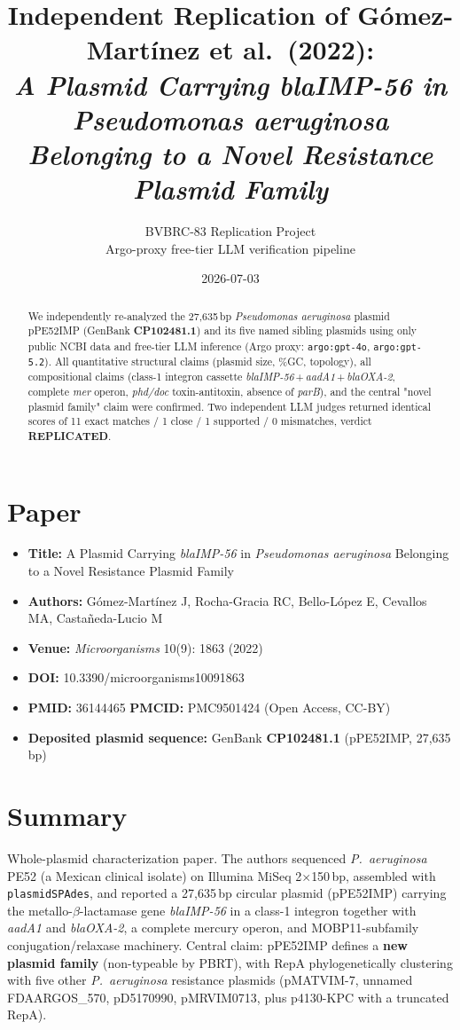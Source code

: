 \documentclass[11pt]{article}
\title{Independent Replication of Gómez-Martínez et al.\ (2022):\\
\textit{A Plasmid Carrying blaIMP-56 in Pseudomonas aeruginosa\\
Belonging to a Novel Resistance Plasmid Family}}
\author{BVBRC-83 Replication Project\\
Argo-proxy free-tier LLM verification pipeline}
\date{2026-07-03}
\begin{document}
\maketitle

\begin{abstract}
We independently re-analyzed the 27{,}635\,bp \textit{Pseudomonas aeruginosa} plasmid
pPE52IMP (GenBank \textbf{CP102481.1}) and its five named sibling plasmids using only
public NCBI data and free-tier LLM inference (Argo proxy: \texttt{argo:gpt-4o},
\texttt{argo:gpt-5.2}). All quantitative structural claims (plasmid size, \%GC,
topology), all compositional claims (class-1 integron cassette
\textit{blaIMP-56}\,+\,\textit{aadA1}\,+\,\textit{blaOXA-2}, complete \textit{mer} operon,
\textit{phd/doc} toxin-antitoxin, absence of \textit{parB}), and the central
"novel plasmid family" claim were confirmed. Two independent LLM judges returned
identical scores of 11 exact matches / 1 close / 1 supported / 0 mismatches, verdict
\textbf{REPLICATED}.
\end{abstract}

\section{Paper}
\begin{itemize}[leftmargin=1.2em]
  \item \textbf{Title:} A Plasmid Carrying \textit{blaIMP-56} in \textit{Pseudomonas aeruginosa}
        Belonging to a Novel Resistance Plasmid Family
  \item \textbf{Authors:} Gómez-Martínez J, Rocha-Gracia RC, Bello-López E, Cevallos MA,
        Castañeda-Lucio M
  \item \textbf{Venue:} \textit{Microorganisms} 10(9): 1863 (2022)
  \item \textbf{DOI:} 10.3390/microorganisms10091863
  \item \textbf{PMID:} 36144465 \quad \textbf{PMCID:} PMC9501424 (Open Access, CC-BY)
  \item \textbf{Deposited plasmid sequence:} GenBank \textbf{CP102481.1} (pPE52IMP, 27{,}635\,bp)
\end{itemize}

\section{Summary}
Whole-plasmid characterization paper. The authors sequenced \textit{P.~aeruginosa} PE52
(a Mexican clinical isolate) on Illumina MiSeq 2$\times$150\,bp, assembled with
\texttt{plasmidSPAdes}, and reported a 27{,}635\,bp circular plasmid (pPE52IMP) carrying
the metallo-$\beta$-lactamase gene \textit{blaIMP-56} in a class-1 integron together with
\textit{aadA1} and \textit{blaOXA-2}, a complete mercury operon, and MOBP11-subfamily
conjugation/relaxase machinery. Central claim: pPE52IMP defines a \textbf{new plasmid
family} (non-typeable by PBRT), with RepA phylogenetically clustering with five other
\textit{P.~aeruginosa} resistance plasmids (pMATVIM-7, unnamed FDAARGOS\_570,
pD5170990, pMRVIM0713, plus p4130-KPC with a truncated RepA).
\end{document}
